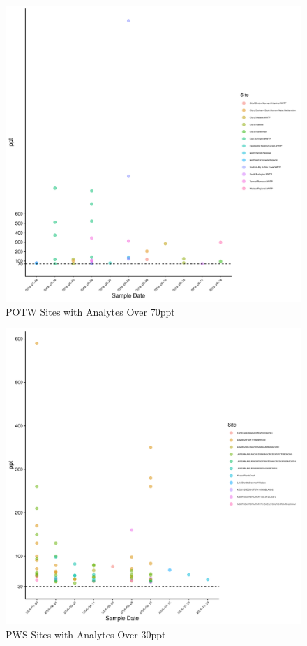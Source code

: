 \documentclass[
  12pt,
]{article}
\begin{document}
\begin{figure}

\includegraphics{PFAS_FinalProject_files/figure-latex/unnamed-chunk-18-1} \hfill{}

\caption{POTW Sites with Analytes Over 70ppt}\label{fig:unnamed-chunk-18}
\end{figure}

\begin{figure}

\includegraphics{PFAS_FinalProject_files/figure-latex/unnamed-chunk-19-1} \hfill{}

\caption{PWS Sites with Analytes Over 30ppt}\label{fig:unnamed-chunk-19}
\end{figure}
\end{document}
